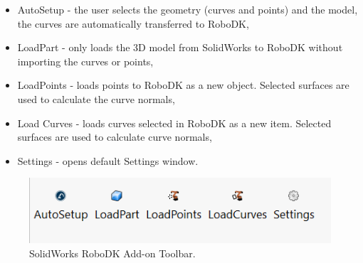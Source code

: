 \begin{itemize}
    \item AutoSetup - the user selects the geometry (curves and points) and the model, the curves are automatically transferred to RoboDK,
    \item LoadPart - only loads the 3D model from SolidWorks to RoboDK without importing the curves or points,
    \item LoadPoints - loads points to RoboDK as a new object. Selected surfaces are used to calculate the curve normals, 
    \item Load Curves -  loads curves selected in RoboDK as a new item. Selected surfaces are used to calculate curve normals, 
    \item Settings - opens default Settings window.
\end{itemize}

\begin{figure}[h]
    \centering
    \includegraphics[width=0.6\linewidth]{img/solidworks_toolbar.PNG}
    \caption{SolidWorks RoboDK Add-on Toolbar.}
    \label{fig:solidworkstoolbar}
\end{figure}



